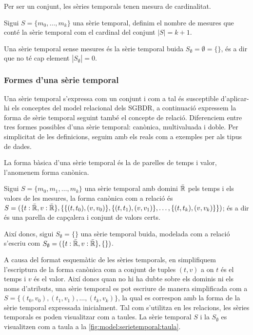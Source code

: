 Per ser un conjunt, les sèries temporals tenen mesura de cardinalitat.
\begin{definition}[Cardinal]
  Sigui $S=\{m_0,\ldots,m_k\}$ una sèrie temporal, definim el nombre
  de mesures que conté la sèrie temporal com el cardinal del conjunt
  $|S|=k+1$. 
\end{definition}

Una sèrie temporal sense mesures és la sèrie temporal buida
$S_\emptyset= \emptyset = \{\}$, és a dir que no té cap element
$|S_\emptyset|=0$.

 


\subsubsection{Formes d'una sèrie temporal}


Una sèrie temporal s'expressa com un conjunt i com a tal és
susceptible d'aplicar-hi els conceptes del model relacional dels
\gls{SGBDR}, a continuació expressem la forma de sèrie temporal  seguint també
el concepte de relació. Diferenciem entre tres formes possibles d'una
sèrie temporal: canònica, multivaluada i doble.  Per simplicitat de
les definicions, seguim amb els reals com a exemples per als tipus de
dades.


La forma bàsica d'una sèrie temporal és la de parelles de temps i
valor, l'anomenem forma canònica. 
\begin{definition}
  Sigui $S = \{ m_0, m_1 , \dotsc, m_k \}$ una sèrie temporal amb
  domini $\bar{\mathbb{R}{}}$ pels temps i els valors de les mesures, la forma
  canònica com a relació és $S = ( \{t: \bar{\mathbb{R}{}}, v:
  \bar{\mathbb{R}{}}\}, \{ \{ (t,t_0),(v,v_0)\}, \{(t,t_1),(v,v_1)\}, \dotsc,
  \{(t,t_k),(v,v_k)\} \} )$; és a dir és una parella de capçalera i conjunt de
  valors certs. 

  Així doncs, sigui $S_{\emptyset} = \{ \}$ una sèrie temporal buida,
  modelada com a relació s'escriu com $S_{\emptyset} = ( \{t:
  \bar{\mathbb{R}{}}, v: \bar{\mathbb{R}{}}\}, \{ \} )$.
\end{definition}


A causa del format esquemàtic de les sèries temporals, en simplifiquem
l'escriptura de la forma canònica com a conjunt de tuples $(t,v)$ a on
$t$ és el temps i $v$ és el valor. Així doncs quan no hi ha dubte
sobre els dominis ni els noms d'atributs, una sèrie temporal es pot
escriure de manera simplificada com a $S = \{ (t_0,v_0), (t_1,v_1),
\dotsc, (t_k,v_k) \}$, la qual es correspon amb la forma de la sèrie
temporal expressada inicialment.
Tal com s'utilitza en les relacions, les sèries temporals es poden
visualitzar com a taules. La sèrie temporal $S$ i la $S_{\emptyset}$
es visualitzen com a taula a la
\autoref{fig:model:serietemporal:taula}.

